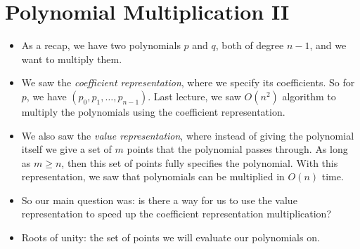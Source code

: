\section{Polynomial Multiplication II}
\begin{itemize}
	\item As a recap, we have two polynomials \( p \) and \( q \), both of degree \(  n -1 \), and we want to multiply 
		them. 
	\item We saw the \textit{coefficient representation}, where we specify its coefficients. So for \( p \), we have \( (p_0, p_1, 
		\dots, p_{n-1})\). Last lecture, we saw \( O(n^2) \) algorithm to multiply the polynomials using the 
		coefficient representation.
	\item We also saw the \textit{value representation}, where instead of giving the polynomial itself we give a set of 
		\( m \) points that the polynomial passes through. As long as \( m \ge  n \), then this set of points 
		fully specifies the polynomial. With this representation, we saw that polynomials can be multiplied in \( O(n) \) time. 
	\item So our main question was: is there a way for us to use the value representation to speed up the coefficient 
		representation multiplication?
	\item Roots of unity: the set of points we will evaluate our polynomials on. 
\end{itemize}
